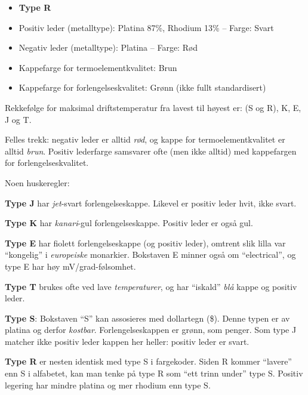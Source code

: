 \vskip 10pt

\begin{itemize}
\item{} {\bf Type R}
\item{} Positiv leder (metalltype): Platina 87\%, Rhodium 13\% -- Farge: Svart
\item{} Negativ leder (metalltype): Platina -- Farge: Rød
\item{} Kappefarge for termoelementkvalitet: Brun
\item{} Kappefarge for forlengelseskvalitet: Grønn (ikke fullt standardisert)
\end{itemize}

\vskip 10pt

Rekkefølge for maksimal driftstemperatur fra lavest til høyest er: (S og R), K, E, J og T.

\vskip 10pt

Felles trekk: negativ leder er alltid {\it rød}, og kappe for termoelementkvalitet er alltid {\it brun}. Positiv lederfarge samsvarer ofte (men ikke alltid) med kappefargen for forlengelseskvalitet.

Noen huskeregler:

\vskip 10pt

{\bf Type J} har {\it jet}-svart forlengelseskappe. Likevel er positiv leder hvit, ikke svart.

\vskip 10pt

{\bf Type K} har {\it kanari}-gul forlengelseskappe. Positiv leder er også gul.

\vskip 10pt

{\bf Type E} har fiolett forlengelseskappe (og positiv leder), omtrent slik lilla var ``kongelig'' i {\it europeiske} monarkier. Bokstaven E minner også om ``electrical'', og type E har høy mV/grad-følsomhet.

\vskip 10pt

{\bf Type T} brukes ofte ved lave {\it temperaturer}, og har ``iskald'' {\it blå} kappe og positiv leder.

\vskip 10pt

{\bf Type S}: Bokstaven ``S'' kan assosieres med dollartegn (\$). Denne typen er av platina og derfor {\it kostbar}. Forlengelseskappen er grønn, som penger. Som type J matcher ikke positiv leder kappen her heller: positiv leder er svart.

\vskip 10pt

{\bf Type R} er nesten identisk med type S i fargekoder. Siden R kommer ``lavere'' enn S i alfabetet, kan man tenke på type R som ``ett trinn under'' type S. Positiv legering har mindre platina og mer rhodium enn type S.

